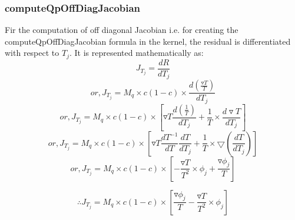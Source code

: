 \documentclass[12pt,a4paper]{article}
\begin{document}
\subsubsection{computeQpOffDiagJacobian}
Fir the computation of off diagonal Jacobian i.e. for creating the computeQpOffDiagJacobian formula in the kernel, the residual is differentiated with respect to $T_j$. It is represented mathematically as:
\begin{equation}
  J_{T_j} = \frac{dR}{dT_j}
  \end{equation}
  \begin{displaymath}
      or, J_{T_j} = M_q \times c(1-c) \times \frac{d (\frac{\triangledown T}{T})}{dT_j} 
 \end{displaymath}
  \begin{displaymath}
      or, J_{T_j} = M_q \times c(1-c) \times [\triangledown T \frac{d (\frac{1}{T})}{dT_j} + \frac{1}{T} \times \frac{d\triangledown T}{dT_j}]
 \end{displaymath}
 \begin{displaymath}
      or, J_{T_j} = M_q \times c(1-c) \times [\triangledown T \frac{dT^{-1}}{dT} \frac{dT}{dT_j} + \frac{1}{T} \times \bigtriangledown (\frac{dT}{dT_j})]
 \end{displaymath}
 \begin{displaymath}
 or, J_{T_j} = M_q \times c(1-c) \times [-\frac{\triangledown T}{T^2} \times \phi_j + \frac{\triangledown \phi_j}{T}]
 \end{displaymath}
 
 \begin{equation}
 \therefore J_{T_j} = M_q \times c(1-c) \times [\frac{\triangledown \phi_j}{T} - \frac{\triangledown T}{T^2} \times \phi_j]
 \end{equation}
 
  
\end{document}
